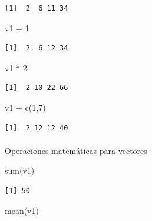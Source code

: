 \documentclass[
  letterpaper,
  DIV=11,
  numbers=noendperiod]{scrartcl}
\makeatletter
\let\oldparagraph\paragraph
\renewcommand{\paragraph}{
    \@ifstar
      \xxxParagraphStar
      \xxxParagraphNoStar
  }
\newcommand{\xxxParagraphStar}[1]{\oldparagraph*{#1}\mbox{}}
\newcommand{\xxxParagraphNoStar}[1]{\oldparagraph{#1}\mbox{}}
\newenvironment{Shaded}{\begin{snugshade}}{\end{snugshade}}
\newcommand{\DecValTok}[1]{\textcolor[rgb]{0.68,0.00,0.00}{#1}}
\newcommand{\FunctionTok}[1]{\textcolor[rgb]{0.28,0.35,0.67}{#1}}
\newcommand{\NormalTok}[1]{\textcolor[rgb]{0.00,0.23,0.31}{#1}}
\newcommand{\SpecialCharTok}[1]{\textcolor[rgb]{0.37,0.37,0.37}{#1}}
\makeatother
\begin{document}
\begin{verbatim}
[1]  2  6 11 34
\end{verbatim}

\begin{Shaded}
\begin{Highlighting}[]
\NormalTok{v1 }\SpecialCharTok{+} \DecValTok{1}       
\end{Highlighting}
\end{Shaded}

\begin{verbatim}
[1]  2  6 12 34
\end{verbatim}

\begin{Shaded}
\begin{Highlighting}[]
\NormalTok{v1 }\SpecialCharTok{*} \DecValTok{2}       
\end{Highlighting}
\end{Shaded}

\begin{verbatim}
[1]  2 10 22 66
\end{verbatim}

\begin{Shaded}
\begin{Highlighting}[]
\NormalTok{v1 }\SpecialCharTok{+} \FunctionTok{c}\NormalTok{(}\DecValTok{1}\NormalTok{,}\DecValTok{7}\NormalTok{)  }
\end{Highlighting}
\end{Shaded}

\begin{verbatim}
[1]  2 12 12 40
\end{verbatim}

\paragraph{Operaciones matemáticas para
vectores}\label{operaciones-matemuxe1ticas-para-vectores}

\begin{Shaded}
\begin{Highlighting}[]
\FunctionTok{sum}\NormalTok{(v1)      }
\end{Highlighting}
\end{Shaded}

\begin{verbatim}
[1] 50
\end{verbatim}

\begin{Shaded}
\begin{Highlighting}[]
\FunctionTok{mean}\NormalTok{(v1)     }
\end{Highlighting}
\end{Shaded}
\end{document}
